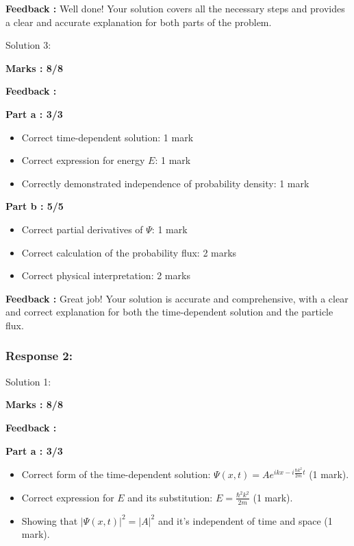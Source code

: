 \documentclass[a4paper,11pt]{article}
\begin{document}
\textbf{Feedback :}
Well done! Your solution covers all the necessary steps and provides a clear and accurate explanation for both parts of the problem.


Solution 3:

\textbf{Marks : 8/8}

\textbf{Feedback : }

\textbf{Part a : 3/3}

\begin{itemize}
    \item Correct time-dependent solution: 1 mark
    \item Correct expression for energy $E$: 1 mark
    \item Correctly demonstrated independence of probability density: 1 mark
\end{itemize}


\textbf{Part b : 5/5}

\begin{itemize}
    \item Correct partial derivatives of $\Psi$: 1 mark
    \item Correct calculation of the probability flux: 2 marks
    \item Correct physical interpretation: 2 marks
\end{itemize}


\textbf{Feedback :}
Great job! Your solution is accurate and comprehensive, with a clear and correct explanation for both the time-dependent solution and the particle flux.



\subsubsection*{Response 2:}

Solution 1:

\textbf{Marks : 8/8}

\textbf{Feedback : }

\textbf{Part a : 3/3}

\begin{itemize}
    \item Correct form of the time-dependent solution: $\Psi(x,t) = Ae^{ikx-i\frac{\hbar k^2}{2m}t}$ (1 mark).
    \item Correct expression for $E$ and its substitution: $E = \frac{\hbar^2 k^2}{2m}$ (1 mark).
    \item Showing that $|\Psi(x,t)|^2 = |A|^2$ and it's independent of time and space (1 mark).
\end{itemize}
\end{document}
